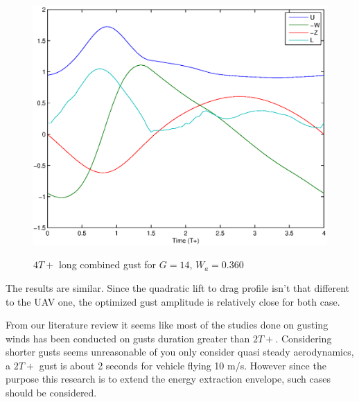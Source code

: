 \begin{figure}[ht]
	\begin{center}
		\scalebox{0.8}
		{\includegraphics{./Figures/Windtype=3_Tg=4_Wg=0p360_quad_G=13.eps}}
	\end{center}
	\caption{$4T+$ long combined gust for $G=14$, $W_a=0.360$}
	\label{fig:combined_optimization_UAV_modified}
\end{figure}

\par The results are similar.
Since the quadratic lift to drag profile isn't that different to the UAV one, the optimized gust amplitude is relatively close for both case.

\FloatBarrier

%




\par From our literature review it seems like most of the studies done on gusting winds has been conducted on gusts duration greater than $2T+$.
Considering shorter gusts seems unreasonable of you only consider quasi steady aerodynamics, a $2T+$ gust is about 2 seconds for vehicle flying 10 m/s.
However since the purpose this research is to extend the energy extraction envelope, such cases should be considered.

